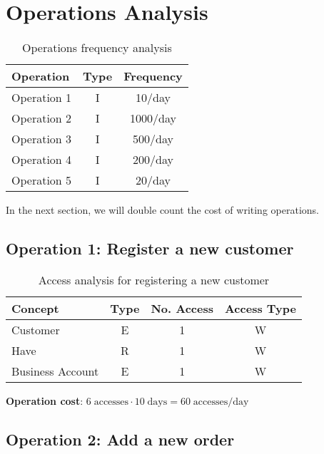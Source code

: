 \section{Operations Analysis}
\begin{table}[h!]
    \centering
    \caption{Operations frequency analysis}
    \begin{tabular}{|l|c|c|}
    \hline
    \textbf{Operation} & \textbf{Type} & \textbf{Frequency} \\
    \hline
    Operation 1 & I & 10/day \\
    \hline
    Operation 2 & I & 1000/day \\
    \hline
    Operation 3 & I & 500/day \\
    \hline
    Operation 4 & I & 200/day \\
    \hline
    Operation 5 & I & 20/day \\
    \hline
    \end{tabular}
    \end{table}
    
    In the next section, we will double count the cost of writing operations.
    
    \subsection*{Operation 1: Register a new customer}
    
    \begin{table}[h!]
    \centering
    \caption{Access analysis for registering a new customer}
    \begin{tabular}{|l|c|c|c|}
    \hline
    \textbf{Concept} & \textbf{Type} & \textbf{No. Access} & \textbf{Access Type} \\
    \hline
    Customer         & E & 1 & W \\
    \hline
    Have             & R & 1 & W \\
    \hline
    Business Account & E & 1 & W \\
    \hline
    \end{tabular}
    \end{table}
    
    \textbf{Operation cost}: $6 \; \text{accesses} \cdot 10 \; \text{days} = 60 \; \text{accesses/day}$
    
    \subsection*{Operation 2: Add a new order}
    
